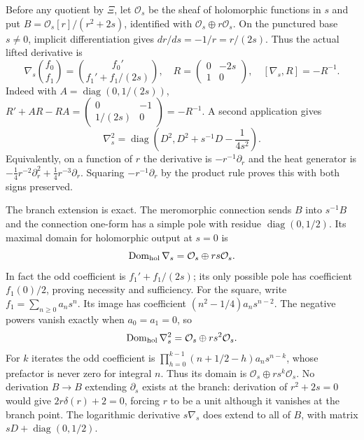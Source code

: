 Before any quotient by $\Xi$, let $\mathcal O_s$ be the sheaf of
holomorphic functions in $s$ and put
$B=\mathcal O_s[r]/(r^2+2s)$, identified with
$\mathcal O_s\oplus r\mathcal O_s$. On the punctured base $s\ne0$,
implicit differentiation gives
$dr/ds=-1/r=r/(2s)$. Thus the actual lifted derivative is
\begin{equation}\label{eq:cq-connection}
 \nabla_s\binom{f_0}{f_1}
 =\binom{f_0'}{f_1'+f_1/(2s)},\quad
 R=\begin{pmatrix}0&-2s\\1&0\end{pmatrix},\quad
 [\nabla_s,R]=-R^{-1}.
\end{equation}
Indeed with $A=\operatorname{diag}(0,1/(2s))$,
$R'+AR-RA=\left(\begin{smallmatrix}0&-1\\1/(2s)&0\end{smallmatrix}\right)
=-R^{-1}$. A second application gives
\begin{equation}\label{eq:cq-connection2}
 \nabla_s^2=\operatorname{diag}
 \left(D^2,D^2+s^{-1}D-\frac1{4s^2}\right).
\end{equation}
Equivalently, on a function of $r$ the derivative is
$-r^{-1}\partial_r$ and the heat generator is
$-\tfrac14r^{-2}\partial_r^2+\tfrac14r^{-3}\partial_r$.
Squaring $-r^{-1}\partial_r$ by the product rule proves this
with both signs preserved.

The branch extension is exact. The meromorphic connection sends
$B$ into $s^{-1}B$ and the connection one-form has a simple pole
with residue $\operatorname{diag}(0,1/2)$. Its maximal domain for
holomorphic output at $s=0$ is
\begin{equation}\label{eq:cq-branchdomain}
 \operatorname{Dom}_{\rm hol}\nabla_s
       =\mathcal O_s\oplus r s\mathcal O_s.
\end{equation}
In fact the odd coefficient is $f_1'+f_1/(2s)$; its only possible
pole has coefficient $f_1(0)/2$, proving necessity and sufficiency.
For the square, write $f_1=\sum_{n\geq0}a_ns^n$. Its image has
coefficient $(n^2-1/4)a_ns^{n-2}$. The negative powers vanish
exactly when $a_0=a_1=0$, so
\[
 \operatorname{Dom}_{\rm hol}\nabla_s^2
       =\mathcal O_s\oplus r s^2\mathcal O_s.
\]
For $k$ iterates the odd coefficient is
$\prod_{h=0}^{k-1}(n+1/2-h)a_ns^{n-k}$, whose prefactor is
never zero for integral $n$. Thus its domain is
$\mathcal O_s\oplus r s^k\mathcal O_s$.
No derivation $B\to B$ extending $\partial_s$ exists at the branch:
derivation of $r^2+2s=0$ would give $2r\delta(r)+2=0$,
forcing $r$ to be a unit although it vanishes at the branch point.
The logarithmic derivative $s\nabla_s$
does extend to all of $B$, with matrix
$sD+\operatorname{diag}(0,1/2)$.

